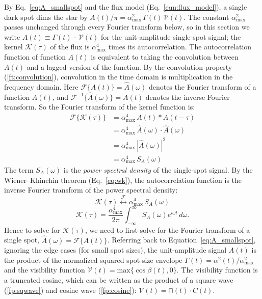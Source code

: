 \documentclass[preprint]{aastex702}
\begin{document}
By Eq.~\eqref{eq:A_smallspot} and the flux model (Eq.~\ref{eqn:flux_model}), a single dark spot dims the star by $A(t)/\pi = \alpha_{\max}^2\,\Gamma(t)\,\mathcal{V}(t)$. The constant $\alpha_{\max}^2$ passes unchanged through every Fourier transform below, so in this section we write $A(t) \equiv \Gamma(t)\, \cdot \, \mathcal{V}(t)$ for the unit-amplitude single-spot signal; the kernel $\mathcal{K}(\tau)$ of the flux is $\alpha_{\max}^4$ times its autocorrelation. The autocorrelation function of function $A(t)$ is equivalent to taking the convolution between $A(t)$ and a lagged version of the function. By the convolution property (\ref{ft:convolution}), convolution in the time domain is multiplication in the frequency domain. Here $\mathcal{F}\{A(t)\} = \hat{A}(\omega)$ denotes the Fourier transform of a function $A(t)$, and $\mathcal{F}^{-1}\{\hat{A}(\omega)\} = A(t)$ denotes the inverse Fourier transform.
So the Fourier transform of the kernel function is:
\begin{align}
    \mathcal{F}\{\mathcal{K}(\tau) \}
        &=  \alpha_{\max}^4\, A(t) \ast A(t - \tau) \\
        &=  \alpha_{\max}^4\, \hat{A}(\omega) \cdot \hat{A}(\omega) \\
        &= \alpha_{\max}^4\, |\hat{A}(\omega)|^2 \\
        & = \alpha_{\max}^4\, S_A(\omega)
\end{align}
The term $S_A(\omega)$ is the \emph{power spectral density} of the single-spot signal. By the Wiener--Khinchin theorem (Eq.~\ref{eq:wk}), the autocorrelation function is the inverse Fourier transform of the power spectral density:
\begin{equation}
    \mathcal{K}(\tau) \overset{\mathcal{F}} \longleftrightarrow \alpha_{\max}^4\, S_A(\omega)
\end{equation}
\begin{equation}
    \mathcal{K}(\tau) = \frac{\alpha_{\max}^4}{2\pi} \int_{-\infty}^\infty S_A(\omega) e^{i\omega t} \, d\omega .
\end{equation}
Hence to solve for $\mathcal{K}(\tau)$, we need to first solve for the Fourier transform of a single spot, $\hat{A}(\omega) = \mathcal{F}\{ A(t) \}$. 
Referring back to Equation~\ref{eq:A_smallspot}, ignoring the edge cases (for small spot sizes), the unit-amplitude signal $A(t)$ is the product of the normalized squared spot-size envelope $\Gamma(t) = \alpha^2(t)/\alpha_{\max}^2$ and the visibility function $\mathcal{V}(t) = \mathrm{max}\{\cos\beta(t), 0 \}$. The visibility function is a truncated cosine, which can be written as the product of a square wave (\ref{fp:sqwave}) and cosine wave (\ref{fp:cosine}): $\mathcal{V}(t) = \sqcap(t) \cdot C(t)$.
\end{document}
